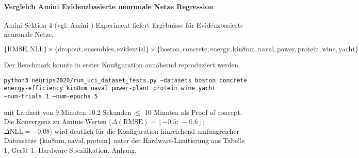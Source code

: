 \begin{otherlanguage}{ngerman}
\paragraph{Vergleich Amini \gls{Evidenzbasierte neuronale Netze} Regression} Amini Sektion 4 (vgl. Amini \parencite{amini2020deep}) Experiment liefert Ergebnisse für \gls{Evidenzbasierte neuronale Netze}.  
\begin{noindentquote}
\scriptsize
$
\{ \text{RMSE}, \text{NLL} \} 
\times 
\{ \text{dropout}, \text{ensembles}, \text{evidential} \} 
\times 
\{ \text{boston}, \text{concrete}, \text{energy}, \text{kin8nm}, \text{naval}, \text{power}, \text{protein}, \text{wine}, \text{yacht} \}
$  
\end{noindentquote}
Der Benchmark konnte in erster Konfiguration annähernd reproduziert werden. 
\begin{noindentquote}
  \scriptsize
  \texttt{python3 neurips2020/run\_uci\_dataset\_tests.py --datasets boston concrete \\
  energy-efficiency kin8nm naval power-plant protein wine yacht \\ 
  --num-trials 1 --num-epochs 5}
\end{noindentquote}
 mit Laufzeit von 9 Minuten 10.2 Sekunden $\leq$ 10 Minuten als \glqq Proof of concept\grqq. Die Konvergenz zu Aminis Werten ($\Delta (\text{RMSE}) = \left[ -0.5;\ -0.6 \right]$; $\Delta \text{NLL} = -0.08$) wird deutlich für die Konfiguration hinreichend umfangreicher Datensätze $\{\text{kin8nm}, \text{naval}, \text{protein} \}$ unter der Hardware-Limitierung aus Tabelle 1, Gerät 1, Hardware-Spezifikation, Anhang. %


\end{otherlanguage}
